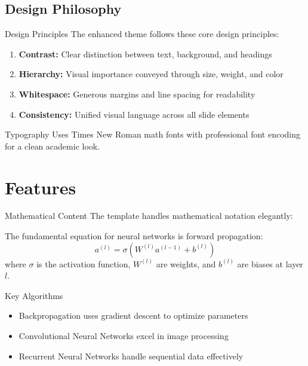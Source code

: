 \documentclass{ctexbeamer}
\begin{document}
\subsection{Design Philosophy}
\begin{frame}{Design Principles}
    The enhanced theme follows these core design principles:
    
    \begin{enumerate}
        \item \textbf{Contrast:} Clear distinction between text, background, and headings
        \item \textbf{Hierarchy:} Visual importance conveyed through size, weight, and color
        \item \textbf{Whitespace:} Generous margins and line spacing for readability
        \item \textbf{Consistency:} Unified visual language across all slide elements
    \end{enumerate}
    
    \vspace{0.5cm}
    \begin{exampleblock}{Typography}
        Uses Times New Roman math fonts with professional font encoding for a clean academic look.
    \end{exampleblock}
\end{frame}

\section{Features}

\begin{frame}{Mathematical Content}
    The template handles mathematical notation elegantly:
    
    \vspace{0.3cm}
    The fundamental equation for neural networks is forward propagation:
    \[
    a^{(l)} = \sigma(W^{(l)}a^{(l-1)} + b^{(l)})
    \]
    where $\sigma$ is the activation function, $W^{(l)}$ are weights, and $b^{(l)}$ are biases at layer $l$.
    
    \vspace{0.3cm}
    \begin{block}{Key Algorithms}
        \begin{itemize}
            \item Backpropagation uses gradient descent to optimize parameters
            \item Convolutional Neural Networks excel in image processing
            \item Recurrent Neural Networks handle sequential data effectively
        \end{itemize}
    \end{block}
\end{frame}
\end{document}
